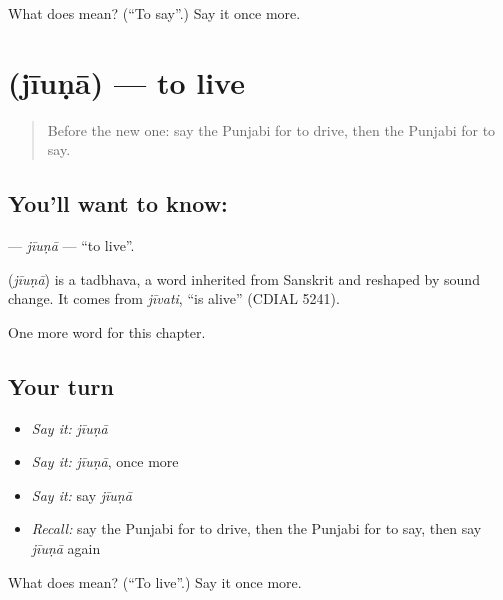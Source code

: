 \begin{tcolorbox}[breakable,colback=teal!4,colframe=teal!35!black,title={Before you move on}]
What does  mean? (\textquotedblleft{}To say\textquotedblright{}.) Say it once more.
\end{tcolorbox}
\section[\texorpdfstring{\pa{ਜੀਉਣਾ} (jīuṇā)}{ਜੀਉਣਾ (jīuṇā)}]{ (jīuṇā) — to live}

\label{lesson:PA-C151-jiuna}



\begin{quote}
Before the new one: say the Punjabi for to drive, then the Punjabi for to say.
\end{quote}

\subsection*{You'll want to know: }
\textbf{} — \emph{jīuṇā} — \textquotedblleft{}to live\textquotedblright{}.

\begin{cousinweb}
\textbf{} (\emph{jīuṇā}) is a tadbhava, a word inherited from Sanskrit and reshaped by sound change. It comes from \emph{jīvati}, \textquotedblleft{}is alive\textquotedblright{} (CDIAL 5241).
\end{cousinweb}

\begin{grammarlens}[title={What you've built}]
One more word for this chapter.
\end{grammarlens}

\subsection*{Your turn}
\begin{itemize}
\raggedright
  \item \emph{Say it:} \emph{jīuṇā}
  \item \emph{Say it:} \emph{jīuṇā}, once more
  \item \emph{Say it:} say \emph{jīuṇā}
  \item \emph{Recall:} say the Punjabi for to drive, then the Punjabi for to say, then say \emph{jīuṇā} again
\end{itemize}

\begin{tcolorbox}[breakable,colback=teal!4,colframe=teal!35!black,title={Before you move on}]
What does  mean? (\textquotedblleft{}To live\textquotedblright{}.) Say it once more.
\end{tcolorbox}
